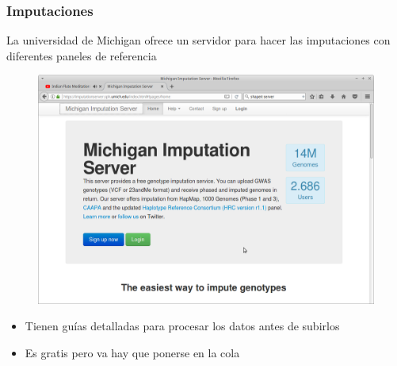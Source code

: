 \documentclass{beamer}\usepackage[]{graphicx}\usepackage[]{color}
\begin{document}
\begin{frame}[fragile]
\frametitle{Imputaciones}
La universidad de Michigan ofrece un servidor para hacer las imputaciones con diferentes paneles de referencia

\begin{figure}[htbp]
\begin{center}
\includegraphics[width=.5\linewidth]{michigan.png}
\end{center}
\end{figure}

\begin{itemize}
\item Tienen gu\'ias detalladas para procesar los datos antes de subirlos
\item Es gratis pero va hay que ponerse en la cola 
\end{itemize}

\end{frame}
\end{document}
